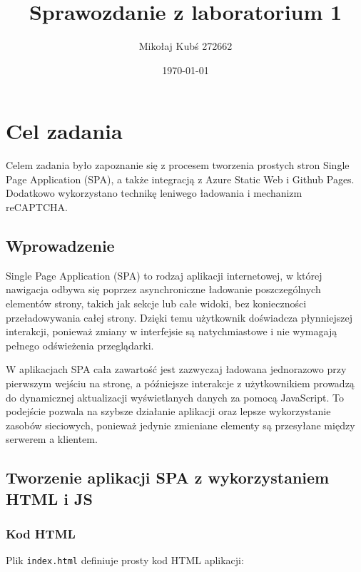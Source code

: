\documentclass[a4paper,12pt]{article}
\title{Sprawozdanie z laboratorium 1}
\author{Mikołaj Kubś 272662}
\date{\today}
\begin{document}
\maketitle

\section{Cel zadania}
Celem zadania było zapoznanie się z procesem tworzenia prostych stron Single Page Application (SPA), a także integracją z Azure Static Web i Github Pages. Dodatkowo wykorzystano technikę leniwego ładowania i mechanizm reCAPTCHA.

\subsection{Wprowadzenie}
Single Page Application (SPA) to rodzaj aplikacji internetowej, w której nawigacja odbywa się poprzez asynchroniczne ładowanie poszczególnych elementów strony, takich jak sekcje lub całe widoki, bez konieczności przeładowywania całej strony. Dzięki temu użytkownik doświadcza płynniejszej interakcji, ponieważ zmiany w interfejsie są natychmiastowe i nie wymagają pełnego odświeżenia przeglądarki.

W aplikacjach SPA cała zawartość jest zazwyczaj ładowana jednorazowo przy pierwszym wejściu na stronę, a późniejsze interakcje z użytkownikiem prowadzą do dynamicznej aktualizacji wyświetlanych danych za pomocą JavaScript. To podejście pozwala na szybsze działanie aplikacji oraz lepsze wykorzystanie zasobów sieciowych, ponieważ jedynie zmieniane elementy są przesyłane między serwerem a klientem.

\subsection{Tworzenie aplikacji SPA z wykorzystaniem HTML i JS}

\subsubsection{Kod HTML}
Plik \texttt{index.html} definiuje prosty kod HTML aplikacji:
\end{document}
